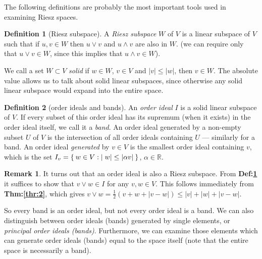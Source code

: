 \documentclass[letterpaper,10pt,oneside,onecolumn,reqno]{amsart}
\newcommand{\R}{\mathbb R}
\theoremstyle{definition}
\newtheorem{defn}{Definition}
\newtheorem{rem}{Remark}
\newcommand{\meet}{\wedge}
\newcommand{\join}{\vee}
\begin{document}
The following definitions are probably the most important tools used
in examining Riesz spaces.
\begin{framed}
  \begin{defn}[Riesz subspace]\label{def:8}
    A \emph{Riesz subspace} $W$ of $V$ is a
    linear subspace of $V$ such that if $u,v \in W$ then $u \join v$
    and $u \meet v$ are also in $W$. (we can require only that $u
    \join v \in W$, since this implies that $u \meet v \in W$).
  \end{defn}
  We call a set $W \subset V$ \emph{solid} if $w \in W$, $v \in V$ and
  $|v| \leq |w|$, then $v \in W$. The absolute value allows us to talk
  about solid linear subspaces, since otherwise any solid linear
  subspace would expand into the entire space.

  \begin{defn}[order ideals and bands]\label{def:9}
    An \emph{order ideal} $I$ is a solid linear
    subspace of $V$. If every subset of this order ideal has its
    supremum (when it exists) in the order ideal itself, we call it a
    \emph{band}. An order ideal generated by a non-empty
    subset $U$ of $V$ is the intersection of all order ideals
    containing $U$ --- similarly for a band. An order ideal
    \emph{generated} by $v \in V$ is the smallest order ideal
    containing $v$, which is the set $I_{v} = \Set{w \in V: |w| \leq
      |\alpha v|}$, $\alpha \in \R$.
  \end{defn}

  \begin{rem}\label{rem:1}
    It turns out that an order ideal is also a Riesz subspace. From
    \textbf{Def:\ref{def:8}} it suffices to show that $v \join w \in
    I$ for any $v,w \in V$. This follows immediately from
    \textbf{Thm:\ref{thr:2}}, which gives $v \join w =
    \frac{1}{2}(v+w+|v-w|) \leq |v| + |w| + |v - w|$.
  \end{rem}


\end{framed}

So every band is an order ideal, but not every order ideal is a
band. We can also distinguish between order ideals (bands) generated
by single elements, or \emph{principal order ideals
  (bands)}. Furthermore, we can examine those elements which can
generate order ideals (bands) equal to the space itself (note that the
entire space is necessarily a band).
\end{document}
